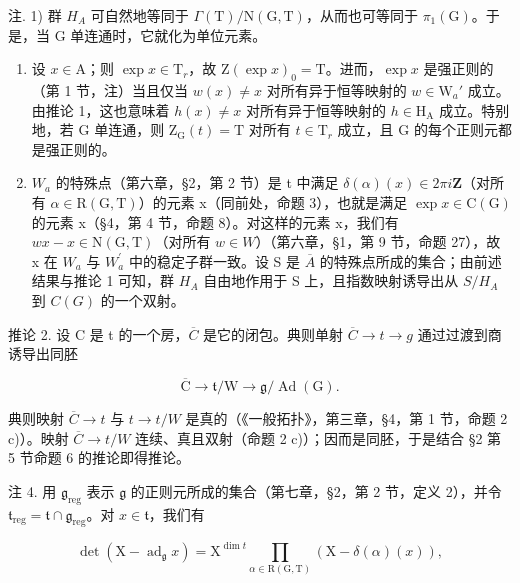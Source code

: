 注. 1) 群 \(H_{A}\) 可自然地等同于 \(\Gamma(\mathrm{T})/\mathrm{N}(\mathrm{G},\mathrm{T})\)，从而也可等同于 \(\pi_{1}(\mathrm{G})\)。于是，当 G 单连通时，它就化为单位元素。

\begin{enumerate}
\def\labelenumi{\arabic{enumi})}
\setcounter{enumi}{1}
\item
  设 \(x \in \mathrm{A}\)；则 \(\exp x \in \mathrm{T}_r\)，故 \(\mathrm{Z}(\exp x)_0 = \mathrm{T}\)。进而，\(\exp x\) 是强正则的（第 1 节，注）当且仅当 \(w(x) \neq x\) 对所有异于恒等映射的 \(w \in \mathrm{W}_a'\) 成立。由推论 1，这也意味着 \(h(x) \neq x\) 对所有异于恒等映射的 \(h \in \mathrm{H}_{\mathrm{A}}\) 成立。特别地，若 \(\mathrm{G}\) 单连通，则 \(\mathrm{Z}_{\mathrm{G}}(t) = \mathrm{T}\) 对所有 \(t \in \mathrm{T}_r\) 成立，且 \(\mathrm{G}\) 的每个正则元都是强正则的。
\item
  \(W_{a}\) 的特殊点（第六章，§2，第 2 节）是 t 中满足 \(\delta(\alpha)(x) \in 2\pi i\mathbf{Z}\)（对所有 \(\alpha \in \mathrm{R}(\mathrm{G}, \mathrm{T})\)）的元素 x（同前处，命题 3），也就是满足 \(\exp x \in \mathrm{C}(\mathrm{G})\) 的元素 x（§4，第 4 节，命题 8）。对这样的元素 x，我们有 \(wx - x \in \mathrm{N}(\mathrm{G}, \mathrm{T})\)（对所有 \(w \in W\)）（第六章，§1，第 9 节，命题 27），故 x 在 \(W_{a}\) 与 \(W_{a}^{\prime}\) 中的稳定子群一致。设 S 是 \(\overline{A}\) 的特殊点所成的集合；由前述结果与推论 1 可知，群 \(H_{A}\) 自由地作用于 S 上，且指数映射诱导出从 \(S/H_{A}\) 到 \(C(G)\) 的一个双射。
\end{enumerate}

推论 2. 设 C 是 t 的一个房，\(\overline{C}\) 是它的闭包。典则单射 \(\overline{C} \rightarrow t \rightarrow g\) 通过过渡到商诱导出同胚

\[
\overline {{\mathrm{C}}} \rightarrow \mathfrak {t} / \mathrm{W} \rightarrow \mathfrak {g} / \operatorname{Ad} (\mathrm{G}).
\]

典则映射 \(\overline{C} \rightarrow t\) 与 \(t \rightarrow t/W\) 是真的（《一般拓扑》，第三章，§4，第 1 节，命题 2 c)）。映射 \(\overline{C} \rightarrow t/W\) 连续、真且双射（命题 2 c)）；因而是同胚，于是结合 §2 第 5 节命题 6 的推论即得推论。

注 4. 用 \(\mathfrak{g}_{\mathrm{reg}}\) 表示 \(\mathfrak{g}\) 的正则元所成的集合（第七章，§2，第 2 节，定义 2），并令 \(\mathfrak{t}_{\mathrm{reg}} = \mathfrak{t} \cap \mathfrak{g}_{\mathrm{reg}}\)。对 \(x \in \mathfrak{t}\)，我们有

\[
\det (\mathrm{X} - \operatorname{ad} _ {\mathfrak {g}} x) = \mathrm{X} ^ {\dim t} \prod_ {\alpha \in \mathrm{R(G,T)}} (\mathrm{X} - \delta (\alpha) (x)),
\]

